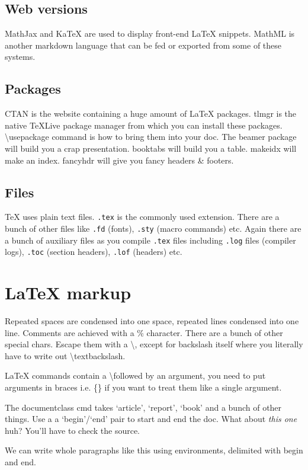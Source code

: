 \documentclass{article}
\begin{document}
\subsection{Web versions}
MathJax and KaTeX are used to display front-end LaTeX snippets. MathML is another markdown language that can be fed or exported from some of these systems.

\subsection{Packages}
CTAN is the website containing a huge amount of LaTeX packages. tlmgr is the native TeXLive package manager from which you can install these packages. \textbackslash usepackage command is how to bring them into your doc. The beamer package will build you a crap presentation. booktabs will build you a table. makeidx will make an index. fancyhdr will give you fancy headers \& footers.

\subsection{Files}
TeX uses plain text files. \texttt{.tex} is the commonly used extension. There are a bunch of other files like \texttt{.fd} (fonts), \texttt{.sty} (macro commands) etc. Again there are a bunch of auxiliary files as you compile \texttt{.tex} files including \texttt{.log} files (compiler logs), \texttt{.toc} (section headers), \texttt{.lof} (headers) etc.

\section{LaTeX markup}
Repeated spaces are condensed into one space, repeated lines condensed into one line. Comments are achieved with a \% character. There are a bunch of other special chars. Escape them with a \textbackslash, except for backslash itself where you literally have to write out \textbackslash textbackslash.

LaTeX commands contain a \textbackslash followed by an argument, you need to put arguments in braces i.e. \{\} if you want to treat them like a single argument.

The documentclass cmd takes `article', `report', `book' and a bunch of other things. Use a a `begin'/`end' pair to start and end the doc. What about \emph{this one} huh? You'll have to check the source.

\begin{em}
We can write whole paragraphs like this using environments, delimited with begin and end.
\end{em}
\end{document}
